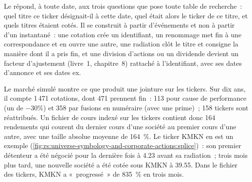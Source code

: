 Le  répond, à toute date, aux trois questions que pose toute table de recherche~: quel titre ce ticker désignait-il
à cette date, quel était alors le ticker de ce titre, et quels titres étaient cotés. Il se construit à partir d'événements et non à partir d'un instantané~:
une cotation crée un identifiant, un renommage met fin à une correspondance et en ouvre une autre, une radiation clôt le titre et consigne la manière dont il a pris fin,
et une division d'actions ou un dividende devient un facteur d'ajustement (livre~1, chapitre~8) rattaché à l'identifiant, avec ses dates d'annonce et
ses dates ex.

Le marché simulé montre ce que produit une jointure sur les tickers. Sur dix ans, il compte 1\,471 cotations, dont 471 prennent fin~: 113 pour
cause de performance (un  de $-30\%$) et 358 par fusions en numéraire (avec une prime)~; 158 tickers sont réattribués. Un fichier de cours indexé
sur les tickers contient donc 164 rendements qui courent du dernier cours d'une société au premier cours d'une autre, avec une taille absolue moyenne
de 164~\%. Le ticker KMKN en est un exemple (\cref{fig:rs:universe-symbology-and-corporate-actions:splice})~: son premier détenteur
a été négocié pour la dernière fois à 4.23 avant sa radiation~; trois mois plus tard, une nouvelle société a été cotée sous KMKN à 39.55. Dans le fichier des tickers, KMKN
a «~progressé~» de 835~\% en trois mois.

\begin{omfigure}

\label{fig:rs:universe-symbology-and-corporate-actions:splice}
\end{omfigure}

